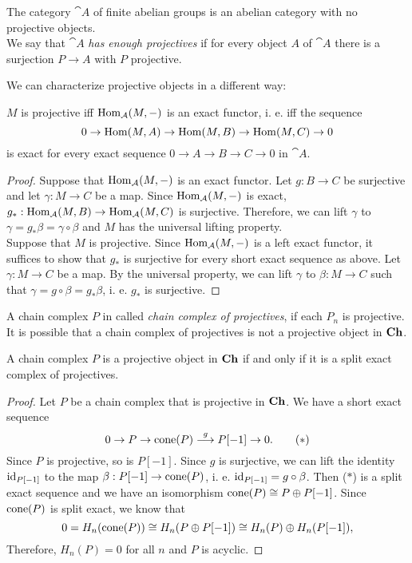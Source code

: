 \begin{remark}
	The category $\cat{A}$ of finite abelian groups is an abelian category with no projective objects. \\
	We say that $\cat{A}$ \textit{has enough projectives} if for every object $A$ of $\cat{A}$ there is a surjection $P\rightarrow A$ with $P$ projective.
\end{remark}

We can characterize projective objects in a different way:

\begin{lemma}
	$M$ is projective iff $\operatorname{Hom}_{\mathcal{A}}(M,-)$ is an exact functor, i. e. iff the sequence 
	$$0 \rightarrow \operatorname{Hom}(M,A) \rightarrow \operatorname{Hom}(M,B) \rightarrow \operatorname{Hom}(M,C) \rightarrow 0$$
	is exact for every exact sequence $0\rightarrow A \rightarrow B \rightarrow C \rightarrow 0$ in $\cat{A}$.
\end{lemma}

\begin{proof}
	Suppose that $\operatorname{Hom}_{\mathcal{A}}(M,-)$ is an exact functor.
	Let $g:B\rightarrow C$ be surjective and let $\gamma:M\rightarrow C$ be a map.
	Since $\operatorname{Hom}_{\mathcal{A}}(M,-)$ is exact, $g_*:\operatorname{Hom}_{\mathcal{A}}(M,B)\rightarrow\operatorname{Hom}_{\mathcal{A}}(M,C)$ is surjective.
	Therefore, we can lift $\gamma$ to $\gamma=g_*\beta=\gamma\circ\beta$ and $M$ has the universal lifting property. \\
	Suppose that $M$ is projective.
	Since $\operatorname{Hom}_{\mathcal{A}}(M,-)$ is a left exact functor, it suffices to show that $g_*$ is surjective for every short exact sequence as above.
	Let $\gamma:M\rightarrow C$ be a map.
	By the universal property, we can lift $\gamma$ to $\beta:M\rightarrow C$ such that $\gamma=g\circ\beta=g_*\beta$, i. e. $g_*$ is surjective.
\end{proof}

A chain complex $P$ in called \textit{chain complex of projectives}, if each $P_n$ is projective.
It is possible that a chain complex of projectives is not a projective object in $\textrm{\textup{\textbf{Ch}}}$.

\begin{exercise}
	A chain complex $P$ is a projective object in $\textrm{\textup{\textbf{Ch}}}$ if and only if it is a split exact complex of projectives.
\end{exercise}

\begin{proof}
	Let $P$ be a chain complex that is projective in $\textrm{\textup{\textbf{Ch}}}$.
	We have a short exact sequence \[0 \rightarrow P \rightarrow \operatorname{cone}(P) \overset{g}{\longrightarrow} P[-1] \rightarrow 0. \tag{$\ast$}\]
	Since $P$ is projective, so is $P[-1]$.
	Since $g$ is surjective, we can lift the identity $\operatorname{id}_{P[-1]}$ to the map $\beta:P[-1]\rightarrow\operatorname{cone}(P)$, i. e. $\operatorname{id}_{P[-1]}=g\circ\beta$.
	Then ($\ast$) is a split exact sequence and we have an isomorphism $\operatorname{cone}(P) \cong P \oplus P[-1]$.
	Since $\operatorname{cone}(P)$ is split exact, we know that
	\[0 = H_n(\operatorname{cone}(P)) \cong H_n(P \oplus P[-1]) \cong H_n(P) \oplus H_n(P[-1]),\]
	Therefore, $H_n(P)=0$ for all $n$ and $P$ is acyclic.
	
\end{proof}

